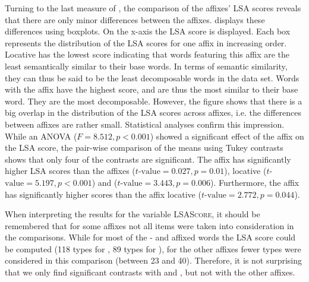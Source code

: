 Turning to the last measure of , the comparison of the affixes' LSA scores reveals that there are only minor differences between the affixes.  displays these differences using boxplots. On the x-axis the LSA score is displayed. Each box represents the distribution of the LSA scores for one affix in increasing order. Locative  has the lowest score indicating that words featuring this affix are the least semantically similar to their base words. In terms of {semantic similarity}, they can thus be said to be the least decomposable words in the data set. Words with the affix  have the highest score, and are thus the most similar to their base word. They are the most decomposable.
However, the figure shows that there is a big overlap in the distribution of the LSA scores across affixes, i.e. the differences between affixes are rather small. Statistical analyses confirm this impression.
While an ANOVA ($F=8.512, p< 0.001$) showed a significant effect of the affix on the LSA score, the pair-wise comparison of the means using Tukey contrasts shows  that only four of the contrasts are significant. The affix  has significantly higher LSA scores than the affixes  ($t$-$\text{value}=0.027, p=0.01$), locative  ($t$-$\text{value}=5.197, p< 0.001$) and   ($t$-$\text{value}=3.443, p=0.006$). Furthermore, the affix  has significantly higher scores than the  affix locative  ($t$-$\text{value}=2.772, p=0.044$). 



When interpreting the results for the variable \textsc{LSAScore}, it should be remembered that for some affixes not all items were taken into consideration in the comparisons. While for most of the - and affixed words the LSA score could be computed (118 types for , 89 types for ), for the other affixes fewer types were considered in this comparison (between 23 and 40). Therefore, it is not surprising that we only find significant contrasts with  and , but not with the other affixes.  
        
